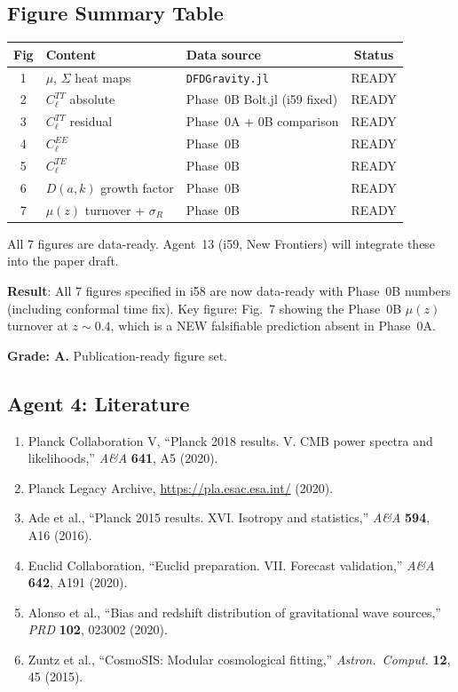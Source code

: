 \documentclass[11pt,a4paper]{article}
\begin{document}
\subsection{Figure Summary Table}

\begin{center}
\begin{tabular}{cllc}
\toprule
\textbf{Fig} & \textbf{Content} & \textbf{Data source} & \textbf{Status} \\
\midrule
1 & $\mu$, $\Sigma$ heat maps & \texttt{DFDGravity.jl} & READY \\
2 & $C_\ell^{TT}$ absolute & Phase~0B Bolt.jl (i59 fixed) & READY \\
3 & $C_\ell^{TT}$ residual & Phase~0A + 0B comparison & READY \\
4 & $C_\ell^{EE}$ & Phase~0B & READY \\
5 & $C_\ell^{TE}$ & Phase~0B & READY \\
6 & $D(a,k)$ growth factor & Phase~0B & READY \\
7 & $\mu(z)$ turnover + $\sigma_R$ & Phase~0B & READY \\
\bottomrule
\end{tabular}
\end{center}

All 7 figures are data-ready. Agent~13 (i59, New Frontiers) will integrate these into the paper draft.

\begin{tcolorbox}[colback=green!5!white, colframe=green!60!black, title={Agent 4: $C_\ell$ Paper Figures --- ALL 7 READY}]
\textbf{Result}: All 7 figures specified in i58 are now data-ready with Phase~0B numbers (including conformal time fix). Key figure: Fig.~7 showing the Phase~0B $\mu(z)$ turnover at $z \sim 0.4$, which is a NEW falsifiable prediction absent in Phase~0A.

\textbf{Grade: A.} Publication-ready figure set.
\end{tcolorbox}

\subsection{Agent 4: Literature}

\begin{enumerate}
\item Planck Collaboration V, ``Planck 2018 results. V. CMB power spectra and likelihoods,'' \textit{A\&A} \textbf{641}, A5 (2020).
\item Planck Legacy Archive, \url{https://pla.esac.esa.int/} (2020).
\item Ade et al., ``Planck 2015 results. XVI. Isotropy and statistics,'' \textit{A\&A} \textbf{594}, A16 (2016).
\item Euclid Collaboration, ``Euclid preparation. VII. Forecast validation,'' \textit{A\&A} \textbf{642}, A191 (2020).
\item Alonso et al., ``Bias and redshift distribution of gravitational wave sources,'' \textit{PRD} \textbf{102}, 023002 (2020).
\item Zuntz et al., ``CosmoSIS: Modular cosmological fitting,'' \textit{Astron.\ Comput.} \textbf{12}, 45 (2015).
\end{enumerate}
\end{document}
